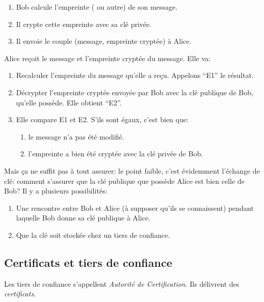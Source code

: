 \begin{enumerate}
  \item Bob calcule l'empreinte ( ou autre) de son
    message.
  \item Il crypte cette empreinte avec sa clé privée.
  \item Il envoie le couple (message, empreinte cryptée) à Alice.
\end{enumerate}

Alice reçoit le message et l'empreinte cryptée du message. Elle va:
\begin{enumerate}
\item Recalculer l'empreinte du message qu'elle a reçu. Appelons
  ``E1'' le résultat. 
\item Décrypter l'empreinte cryptée envoyée par Bob avec la clé
  publique de Bob, qu'elle possède. Elle obtient ``E2''.
\item Elle compare E1 et E2. S'ils sont égaux, c'est bien que:
  \begin{enumerate}
  \item le   message n'a pas été modifié.
  \item l'empreinte a bien été cryptée avec la clé privée de Bob.
  \end{enumerate}
\end{enumerate}

Mais ça ne suffit pas à tout assurer: le point faible, c'est
évidemment l'échange de clé: comment s'assurer que la clé publique que
possède Alice est bien celle de Bob? Il y a plusieurs possibilités:
\begin{enumerate}
  \item Une rencontre entre Bob et Alice (à supposer qu'ils se
    connaissent) pendant laquelle Bob donne sa clé publique à Alice.
  \item Que la clé soit stockée chez un tiers de confiance.
\end{enumerate}
\subsection{Certificats et tiers de confiance}
Les tiers de confiance s'appellent \emph{Autorité de
  Certification}. Ils délivrent des \emph{certificats}.

